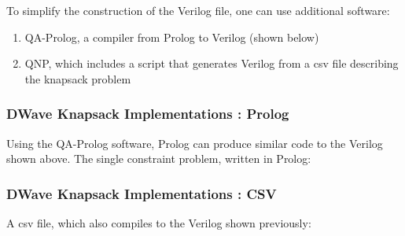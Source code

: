 \documentclass{article}
\begin{document}
\lstset{language=Verilog}


\newpage

To simplify the construction of the Verilog file, one can use additional software:
\begin{enumerate}
    \item{QA-Prolog, a compiler from Prolog to Verilog (shown below)}
    \item{QNP, which includes a script that generates Verilog from a csv file describing the knapsack problem}
\end{enumerate}

\subsubsection{DWave Knapsack Implementations : Prolog}

Using the QA-Prolog software, Prolog can produce similar code to the Verilog shown above.
The single constraint problem, written in Prolog:
\lstset{language=Prolog}


\subsubsection{DWave Knapsack Implementations : CSV}

A csv file, which also compiles to the Verilog shown previously:

\end{document}
